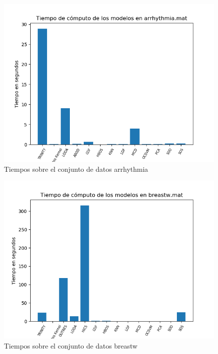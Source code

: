 \begin{figure}[H]
	\centering
	\label{arrhythmia_times}
	\includegraphics[scale=0.7]{imagenes/imgs-exp1/times/arrhythmia}
	\caption{Tiempos sobre el conjunto de datos arrhythmia}
\end{figure}

\begin{figure}[H]
	\centering
	\label{breastw_times}
	\includegraphics[scale=0.7]{imagenes/imgs-exp1/times/breastw}
	\caption{Tiempos sobre el conjunto de datos breastw}
\end{figure}

